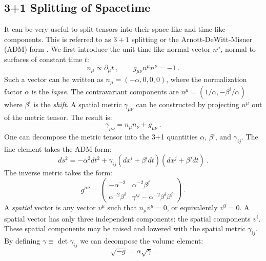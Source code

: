    \subsection{3+1 Splitting of Spacetime}
   
   It can be very useful to split tensors into their space-like and time-like components.  This is referred to as $3+1$ splitting or the Arnott-DeWitt-Misner (ADM) form \citep{ADM}.  We first introduce the unit time-like normal vector $n^\mu$, normal to surfaces of constant time $t$:
   \begin{equation}
   	n_\mu \propto \partial_\mu t\ , \qquad g_{\mu\nu}n^\mu n^\nu = -1\ .
   \end{equation}
   Such a vector can be written as $n_\mu = (-\alpha, 0, 0, 0)$, where the normalization factor $\alpha$ is the \emph{lapse}.  The contravariant components are $n^\mu = (1/\alpha, -\beta^i/\alpha)$ where $\beta^i$ is the \emph{shift}.  A spatial metric $\gamma_{\mu\nu}$ can be constructed by projecting $n^\mu$ out of the metric tensor.  The result is:
   \begin{equation}
   	\gamma_{\mu\nu} = n_\mu n_\nu + g_{\mu\nu}\ .
   \end{equation}
   One can decompose the metric tensor into the 3+1 quantities $\alpha$, $\beta^i$, and $\gamma_{ij}$.  The line element takes the ADM form:
   \begin{equation}
   	ds^2 = -\alpha^2 dt^2 + \gamma_{ij}\left(dx^i + \beta^idt\right)\left(dx^j + \beta^jdt\right)\ .
   \end{equation}
   The inverse metric takes the form:
   \begin{equation}
   	g^{\mu\nu} = \begin{pmatrix} -\alpha^{-2} & \alpha^{-2}\beta^j \\
							\alpha^{-2}\beta^i & \gamma^{ij} - \alpha^{-2}\beta^i \beta^j \end{pmatrix}\ .
   \end{equation}
   A \emph{spatial} vector is any vector $v^\mu$ such that $n_\mu v^\mu = 0$, or equivalently $v^0 = 0$.  A spatial vector has only three independent components: the spatial components $v^i$.  These spatial components may be raised and lowered with the spatial metric $\gamma_{ij}$.  By defining $\gamma \equiv \det \gamma_{ij}$ we can decompose the volume element:
   \begin{equation}
   	\sqrt{-g} = \alpha \sqrt{\gamma} \ .
   \end{equation}
   
